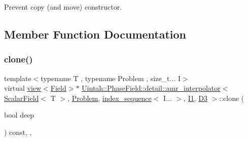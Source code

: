 Prevent copy (and move) constructor. 



\subsection{Member Function Documentation}
\mbox{\label{classUintah_1_1PhaseField_1_1detail_1_1amr__interpolator_3_01ScalarField_3_01T_01_4_00_01Problemdf68628a6010a1e1526666730125c372_a69b809d731de3fdfe713ac4321394962}} 
\subsubsection{\texorpdfstring{clone()}{clone()}\hspace{0.1cm}{\footnotesize\ttfamily [1/2]}}
{\footnotesize\ttfamily template$<$typename T , typename Problem , size\+\_\+t... I$>$ \\
virtual \hyperlink{classUintah_1_1PhaseField_1_1detail_1_1view}{view}$<$\hyperlink{structUintah_1_1PhaseField_1_1ScalarField}{Field}$>$$\ast$ \hyperlink{classUintah_1_1PhaseField_1_1detail_1_1amr__interpolator}{Uintah\+::\+Phase\+Field\+::detail\+::amr\+\_\+interpolator}$<$ \hyperlink{structUintah_1_1PhaseField_1_1ScalarField}{Scalar\+Field}$<$ T $>$, \hyperlink{classUintah_1_1PhaseField_1_1Problem}{Problem}, \hyperlink{namespaceUintah_1_1PhaseField_a237de804d99512e50613aff7c94a9461}{index\+\_\+sequence}$<$ I... $>$, \hyperlink{namespaceUintah_1_1PhaseField_a547ce3002aa97fbd3ef3192a6eec8406a66f19efe774b0d2b6e5844eb2d83d305}{I1}, \hyperlink{namespaceUintah_1_1PhaseField_a12bfc68444894dffdf0cb8d9cf0cc76aa72fd61934c7ca788c49ad90629f76e78}{D3} $>$\+::clone (\begin{DoxyParamCaption}\item[{bool}]{deep }\end{DoxyParamCaption}) const\hspace{0.3cm}{\ttfamily [inline]}, {\ttfamily [override]}, {\ttfamily [virtual]}}



